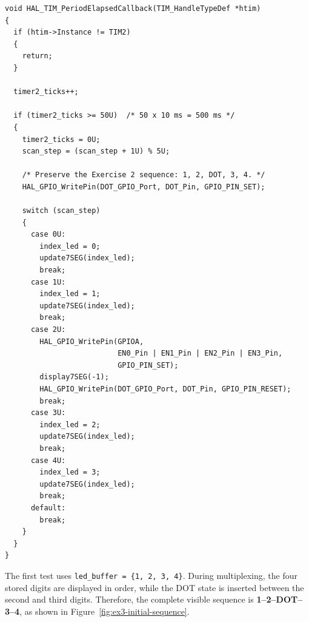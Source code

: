 \begin{lstlisting}[caption={Timer callback using update7SEG in Exercise 3}]
void HAL_TIM_PeriodElapsedCallback(TIM_HandleTypeDef *htim)
{
  if (htim->Instance != TIM2)
  {
    return;
  }

  timer2_ticks++;

  if (timer2_ticks >= 50U)  /* 50 x 10 ms = 500 ms */
  {
    timer2_ticks = 0U;
    scan_step = (scan_step + 1U) % 5U;

    /* Preserve the Exercise 2 sequence: 1, 2, DOT, 3, 4. */
    HAL_GPIO_WritePin(DOT_GPIO_Port, DOT_Pin, GPIO_PIN_SET);

    switch (scan_step)
    {
      case 0U:
        index_led = 0;
        update7SEG(index_led);
        break;
      case 1U:
        index_led = 1;
        update7SEG(index_led);
        break;
      case 2U:
        HAL_GPIO_WritePin(GPIOA,
                          EN0_Pin | EN1_Pin | EN2_Pin | EN3_Pin,
                          GPIO_PIN_SET);
        display7SEG(-1);
        HAL_GPIO_WritePin(DOT_GPIO_Port, DOT_Pin, GPIO_PIN_RESET);
        break;
      case 3U:
        index_led = 2;
        update7SEG(index_led);
        break;
      case 4U:
        index_led = 3;
        update7SEG(index_led);
        break;
      default:
        break;
    }
  }
}
\end{lstlisting}

The first test uses \texttt{led\_buffer = \{1, 2, 3, 4\}}. During multiplexing, the four stored digits are displayed in order, while the DOT state is inserted between the second and third digits. Therefore, the complete visible sequence is \textbf{1--2--DOT--3--4}, as shown in Figure~\ref{fig:ex3-initial-sequence}.

